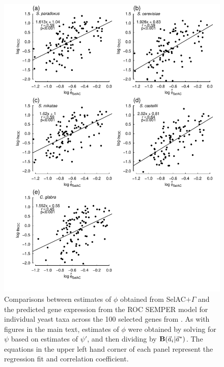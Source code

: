 \documentclass[onecolumn,letterpaper,fleqn,nogrid]{myMBE}%
\newcommand{\Funcaveci}{\ensuremath{\Func(\aveci|\aoptvec)}\xspace}
\newcommand{\Func}{\ensuremath{\text{\textbf{B}}}\xspace}
\newcommand{\selacplusgamma}{SelAC$+\Gamma$\xspace}
\newcommand{\aoptvec}{\ensuremath{\Vec{a}^*}\xspace}
\newcommand{\aveci}{\ensuremath{\Vec{a}_i}\xspace}
\newcommand{\psiprime}{\ensuremath{\psi'}\xspace}
\begin{document}
\begin{figure}%
  \centering
  \includegraphics[width=0.9\linewidth]{FIGURE_S1_SelACwG_vs_ROC_by_spp_ALLspp.pdf}
  \caption{Comparisons between estimates of $\phi$ obtained from \selacplusgamma and the predicted gene expression from the ROC SEMPER model \citep{GilchristEtAl2015} for individual yeast taxa across the 100 selected genes from \citet{SalichosAndRokas2013}.
        As with figures in the main text, estimates of $\phi$ were obtained by solving for $\psi$ based on estimates of $\psiprime$, and then dividing by \Funcaveci.
                The equations in the upper left hand corner of each panel represent the regression fit and correlation coefficient.
  }
  \label{fig:PhivsROC}
\end{figure}
\end{document}
